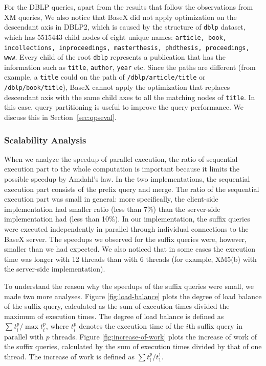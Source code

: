 For the DBLP queries, apart from the results that follow the observations from
XM queries, We also notice that BaseX did not apply optimization on the
descendant axis in DBLP2, which is caused by the structure of \texttt{dblp}
dataset, which has 5515443 child nodes of eight unique names: \texttt{article,
book, incollections, inproceedings, masterthesis, phdthesis, proceedings, www}.
Every child of the root \texttt{dblp} represents a publication that has the
information such as \texttt{title}, \texttt{author}, \texttt{year} etc. Since
the paths are different (from example, a \texttt{title} could on the path of
\texttt{/dblp/article/title} or \texttt{/dblp/book/title}), BaseX cannot apply
the optimization that replaces descendant axis with the same child axes to all
the matching nodes of \texttt{title}. In this case, query partitioning is useful
to improve the query performance. We discuss this in Section~\ref{sec:qpseval}.

\subsubsection{Scalability Analysis}
\label{sec:dpsscal}

When we analyze the speedup of parallel execution, the ratio of sequential
execution part to the whole computation is important because it limits the
possible speedup by Amdahl's law. In the two implementations, the sequential
execution part consists of the prefix query and merge. The ratio of the
sequential execution part was small in general: more specifically, the
client-side implementation had smaller ratio (less than 7\%) than the
server-side implementation had (less than 10\%). In our implementation, the
suffix queries were executed independently in parallel through individual
connections to the BaseX server. The speedups we observed for the suffix queries
were, however, smaller than we had expected.  We also noticed that in some cases
the execution time was longer with 12 threads than with 6 threads (for example,
XM5(b) with the server-side implementation).

To understand the reason why the speedups of the suffix queries were small, we
made two more analyses. Figure \ref{fig:load-balance} plots the degree of load
balance of the suffix query, calculated as the sum of execution times divided
the maximum of execution times. The degree of load balance is defined as $\sum
t_i^{p} / \max t_i^p$, where $t_i^p$ denotes the execution time of the $i$th
suffix query in parallel with $p$ threads. Figure \ref{fig:increase-of-work}
plots the increase of work of the suffix queries, calculated by the sum of
execution times divided by that of one thread. The increase of work is defined
as $\sum t_i^{p} / t_1^{1}$.

